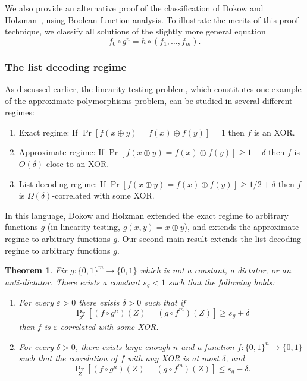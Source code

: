 \documentclass{article}
\newtheorem{theorem}{Theorem}[section]
\theoremstyle{definition}
\theoremstyle{remark}
\newcommand\eps{\varepsilon}
\renewcommand\epsilon{\eps}
\renewcommand\geq{\geqslant}
\renewcommand\leq{\leqslant}
\begin{document}
We also provide an alternative proof of the classification of Dokow and Holzman~\cite{DH09}, using Boolean function analysis. To illustrate the merits of this proof technique, we classify all solutions of the slightly more general equation
\[
 f_0 \circ g^{n} = h \circ (f_1,\ldots,f_m).
\]

\subsubsection{The list decoding regime} 
As discussed earlier, the linearity testing problem, which constitutes 
one example of the approximate polymorphisms problem, can be studied in
several different regimes:
\begin{enumerate}
    \item Exact regime: If $\Pr[f(x \oplus y) = f(x) \oplus f(y)] = 1$ then $f$ is an XOR.
    \item Approximate regime: If $\Pr[f(x \oplus y) = f(x) \oplus f(y)] \geq 1-\delta$ then $f$ is $O(\delta)$-close to an XOR.
    \item List decoding regime: If $\Pr[f(x \oplus y) = f(x) \oplus f(y)] \geq 1/2 + \delta$ then $f$ is $\Omega(\delta)$-correlated with some XOR.
\end{enumerate}
In this language, Dokow and Holzman extended the exact regime to arbitrary functions $g$ (in linearity testing, $g(x,y) = x \oplus y$), and  extends the approximate regime to arbitrary functions $g$. Our second main result extends the list decoding regime to arbitrary functions $g$.

\begin{theorem} \label{thm:list-decoding-intro}
Fix $g\colon \{0,1\}^m \to \{0,1\}$ which is not a constant, a dictator, or an anti-dictator. There exists a constant $s_g < 1$ such that the following holds:

\begin{enumerate}
    \item For every $\epsilon > 0$ there exists $\delta > 0$ such that if
\[
 \Pr_Z[(f \circ g^{n})(Z) = (g \circ f^{m})(Z)] \geq s_g + \delta
\]
then $f$ is $\epsilon$-correlated with some XOR.
\item For every $\delta>0$, there exists large enough $n$ and a function 
$f\colon\{0,1\}^n\to\{0,1\}$ such that the correlation of $f$ with any XOR is
at most $\delta$, and 
\[
\Pr_Z[(f \circ g^{n})(Z) = (g \circ f^{m})(Z)] \leq s_g - \delta.
\]
\end{enumerate}
\end{theorem}
\end{document}

